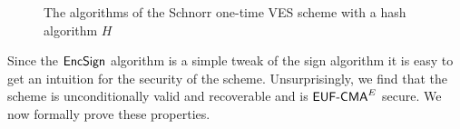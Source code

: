 \begin{figure}[h]
\begin{mdframed}
\begin{pchstack}[center]
    \pchspace
    \end{pchstack}
    \begin{pchstack}[center]
    \pchspace
    \pchspace
    \pchspace
    \end{pchstack}
    \end{mdframed}
    \caption{The algorithms of the Schnorr one-time VES scheme with a hash algorithm $H$}
    \label{fig:schnorr-ves}
\end{figure}

Since the $\textsf{EncSign}$ algorithm is a simple tweak of the sign algorithm it is easy to get an intuition for the security of the scheme.
Unsurprisingly, we find that the scheme is unconditionally valid and recoverable and is $\textsf{EUF-CMA}^E$ secure.
We now formally prove these properties.


